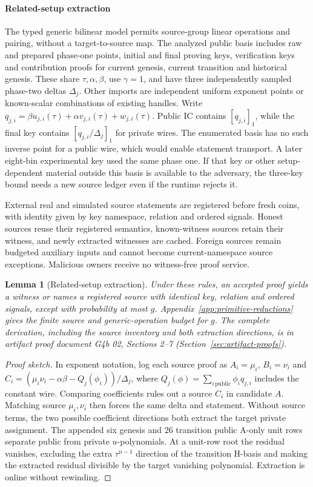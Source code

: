 \documentclass[conference,compsoc]{IEEEtran}
\theoremstyle{definition}
\numberwithin{equation}{section}
\numberwithin{table}{section}
\numberwithin{figure}{section}
\theoremstyle{plain}
\newtheorem{lemma}{Lemma}[section]
\newtheorem{lemma}{Lemma}
\begin{document}
\paragraph{Related-setup extraction}
The typed generic bilinear model permits source-group linear operations and
pairing, without a target-to-source map. The analyzed public basis includes
raw and prepared phase-one points, initial and final proving keys, verification
keys and contribution proofs for current genesis, current transition and
historical genesis. These share \(\tau,\alpha,\beta\), use \(\gamma=1\), and
have three independently sampled phase-two deltas \(\Delta_j\). Other imports
are independent uniform exponent points or known-scalar combinations of
existing handles. Write \(q_{j,i}=\beta u_{j,i}(\tau)+\alpha v_{j,i}(\tau)+
w_{j,i}(\tau)\). Public IC contains \([q_{j,i}]_1\), while the final key
contains \([q_{j,i}/\Delta_j]_1\) for private wires. The enumerated basis has
no such inverse point for a public wire, which would enable statement
transport. A later eight-bin experimental key used the same phase one. If that
key or other setup-dependent material outside this basis is available to the adversary,
the three-key bound needs a new source ledger even if the runtime rejects it.

External real and simulated source statements are registered before fresh
coins, with identity given by key namespace, relation and ordered signals.
Honest sources reuse their registered semantics, known-witness sources retain
their witness, and newly extracted witnesses are cached. Foreign sources remain
budgeted auxiliary inputs and cannot become current-namespace source exceptions.
Malicious owners receive no witness-free proof service.

\begin{lemma}[Related-setup extraction]
\label{lem:related-crs-extraction}
Under these rules, an accepted proof yields a witness or names a registered
source with identical key, relation and ordered signals, except with
probability at most \(g\). Appendix~\ref{app:primitive-reductions} gives the
finite source and generic-operation budget for \(g\).
The complete derivation, including the source inventory and both extraction
directions, is in artifact proof document G4b 02, Sections 2--7
(Section~\ref{sec:artifact-proofs}).
\end{lemma}
\begin{proof}[Proof sketch]
In exponent notation, log each source proof as \(A_i=\mu_i\), \(B_i=\nu_i\) and
\(C_i=(\mu_i\nu_i-\alpha\beta-Q_j(\phi_i))/\Delta_j\), where
\(Q_j(\phi)=\sum_{i\,\mathrm{public}}\phi_iq_{j,i}\) includes the constant
wire. Comparing coefficients rules out a source \(C_i\) in candidate \(A\).
Matching source \(\mu_i,\nu_i\) then forces the same delta and statement.
Without source terms, the two possible coefficient directions both extract
the target private assignment. The appended six genesis and 26 transition
public A-only unit rows separate public from private \(u\)-polynomials. At a
unit-row root the residual vanishes, excluding the extra \(\tau^{n-1}\)
direction of the transition H-basis and making the extracted residual divisible
by the target vanishing polynomial. Extraction is online without rewinding.
\end{proof}
\end{document}
